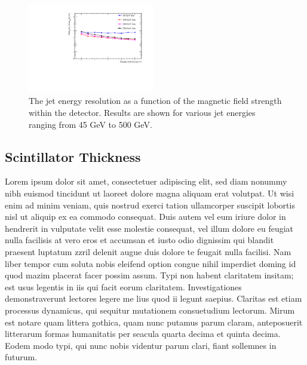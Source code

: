 \documentclass[final,3p,times,twocolumn]{elsarticle}
\begin{document}
\begin{figure}[!h]
  \begin{center}
     \includegraphics[width=0.49\textwidth]{7_GlobalParamScan/JER_vs_MagneticFieldStrength.pdf}
     \caption{The jet energy resolution as a function of the magnetic field strength within the detector.  Results are shown for various jet energies ranging from 45 GeV to 500 GeV.\label{}}
  \end{center}
\end{figure}

\subsection{Scintillator Thickness}
Lorem ipsum dolor sit amet, consectetuer adipiscing elit, sed diam nonummy nibh euismod tincidunt ut laoreet dolore magna aliquam erat volutpat. Ut wisi enim ad minim veniam, quis
nostrud exerci tation ullamcorper suscipit lobortis nisl ut aliquip ex ea commodo consequat. Duis autem vel eum iriure dolor in hendrerit in vulputate velit esse molestie consequat,
vel illum dolore eu feugiat nulla facilisis at vero eros et accumsan et iusto odio dignissim qui blandit praesent luptatum zzril delenit augue duis dolore te feugait nulla facilisi.
Nam liber tempor cum soluta nobis eleifend option congue nihil imperdiet doming id quod mazim placerat facer possim assum. Typi non habent claritatem insitam; est usus legentis in
iis qui facit eorum claritatem. Investigationes demonstraverunt lectores legere me lius quod ii legunt saepius. Claritas est etiam processus dynamicus, qui sequitur mutationem
consuetudium lectorum. Mirum est notare quam littera gothica, quam nunc putamus parum claram, anteposuerit litterarum formas humanitatis per seacula quarta decima et quinta
decima. Eodem modo typi, qui nunc nobis videntur parum clari, fiant sollemnes in futurum.

\end{document}

